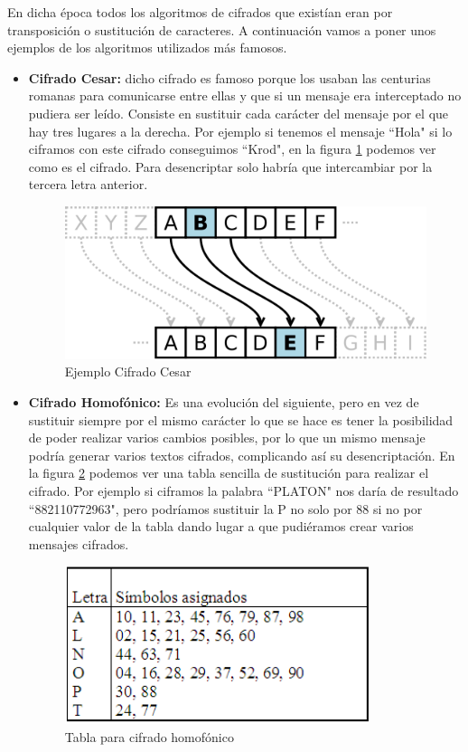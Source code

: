 	En dicha época todos los algoritmos de cifrados que existían eran por transposición o sustitución de caracteres. A continuación vamos a poner unos ejemplos de los algoritmos utilizados más famosos. 
\begin{itemize}

	\item \textbf{Cifrado Cesar:} dicho cifrado es famoso porque los usaban las centurias romanas para comunicarse entre ellas y que si un mensaje era interceptado no pudiera ser leído. Consiste en sustituir cada carácter del mensaje por el que hay tres lugares a la derecha. Por ejemplo si tenemos el mensaje ``Hola" si lo ciframos con este cifrado conseguimos ``Krod", en la figura \ref{fig:cifradoCesar} podemos ver como es el cifrado.
	Para desencriptar solo habría que intercambiar por la tercera letra anterior.

\begin{figure}[h]
  \centering
    \includegraphics[scale=0.6]{./ConocimientosPrevios/imagenes/cifradoCesar.png}
  \caption{Ejemplo Cifrado Cesar}
  \label{fig:cifradoCesar}
\end{figure} 

	\item \textbf{Cifrado Homofónico:} Es una evolución del siguiente, pero en vez de sustituir siempre por el mismo carácter lo que se hace es tener la posibilidad de poder realizar varios cambios posibles, por lo que un mismo mensaje podría generar varios textos cifrados, complicando así su desencriptación. En la figura \ref{fig:cifradoHomofonico} podemos ver una tabla sencilla de sustitución para realizar el cifrado. Por ejemplo si ciframos la palabra ``PLATON" nos daría de resultado ``882110772963", pero podríamos sustituir la P no solo por 88 si no por cualquier valor de la tabla dando lugar a que pudiéramos crear varios mensajes cifrados.
	
\begin{figure}[h]
  \centering
    \includegraphics[scale=0.7]{./ConocimientosPrevios/imagenes/cifradoHomofonico.png}
  \caption{Tabla para cifrado homofónico}
  \label{fig:cifradoHomofonico}
\end{figure}


\end{itemize}
